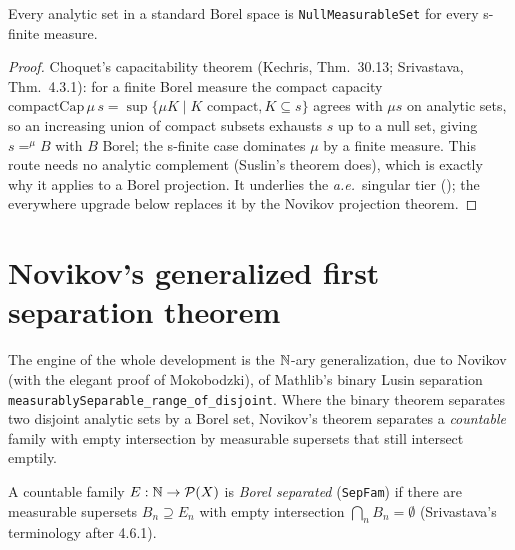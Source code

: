 \begin{theorem}\label{thm:dst-nullmeas}
  \leanok
  Every analytic set in a standard Borel space is \texttt{NullMeasurableSet} for every s-finite
  measure.
\end{theorem}
\begin{proof}\leanok
  Choquet's capacitability theorem (Kechris, Thm.~30.13; Srivastava, Thm.~4.3.1): for a finite
  Borel measure the compact capacity \(\mathrm{compactCap}\,\mu\,s=\sup\{\mu K\mid K\text{ compact},
  K\subseteq s\}\) agrees with \(\mu s\) on analytic sets, so an increasing union of compact
  subsets exhausts \(s\) up to a null set, giving \(s=^{\mu}B\) with \(B\) Borel; the s-finite case
  dominates \(\mu\) by a finite measure. This route needs no analytic complement (Suslin's theorem
  does), which is exactly why it applies to a Borel projection. It underlies the \emph{a.e.}\
  singular tier (); the everywhere upgrade below replaces it by the
  Novikov projection theorem.
\end{proof}

\section{Novikov's generalized first separation theorem}

The engine of the whole development is the \(\mathbb{N}\)-ary generalization, due to Novikov (with the
elegant proof of Mokobodzki), of Mathlib's binary Lusin separation
\texttt{measurablySeparable\_range\_of\_disjoint}. Where the binary theorem separates two disjoint
analytic sets by a Borel set, Novikov's theorem separates a \emph{countable} family with empty
intersection by measurable supersets that still intersect emptily.

\begin{definition}\label{thm:dst-sepfam}
  \lean{ErgodicTheory.SepFam}\leanok
  A countable family \(E:\mathbb{N}\to\mathcal P(X)\) is \emph{Borel separated} (\texttt{SepFam}) if there
  are measurable supersets \(B_n\supseteq E_n\) with empty intersection
  \(\bigcap_n B_n=\emptyset\) (Srivastava's terminology after 4.6.1).
\end{definition}

